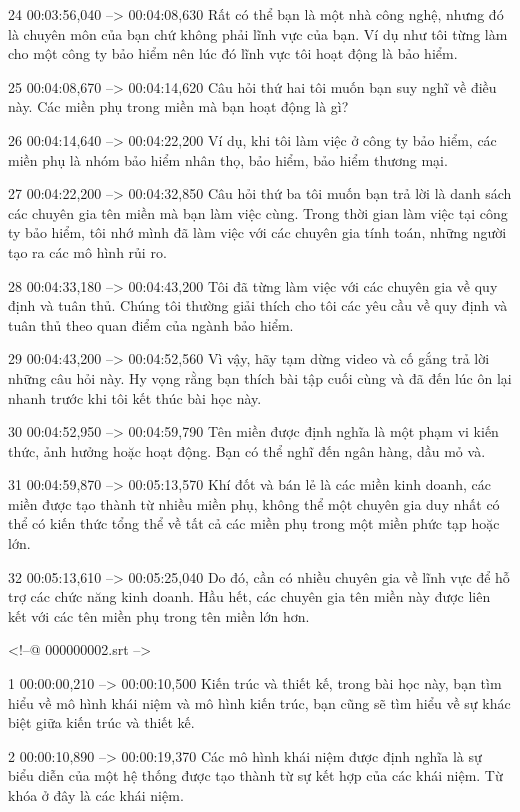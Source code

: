 24
00:03:56,040 --> 00:04:08,630
Rất có thể bạn là một nhà công nghệ, nhưng đó là chuyên môn của bạn chứ không phải lĩnh vực của bạn.  Ví dụ như tôi từng làm cho một công ty bảo hiểm nên lúc đó lĩnh vực tôi hoạt động là bảo hiểm.

25
00:04:08,670 --> 00:04:14,620
Câu hỏi thứ hai tôi muốn bạn suy nghĩ về điều này.  Các miền phụ trong miền mà bạn hoạt động là gì?

26
00:04:14,640 --> 00:04:22,200
Ví dụ, khi tôi làm việc ở công ty bảo hiểm, các miền phụ là nhóm bảo hiểm nhân thọ, bảo hiểm, bảo hiểm thương mại.

27
00:04:22,200 --> 00:04:32,850
Câu hỏi thứ ba tôi muốn bạn trả lời là danh sách các chuyên gia tên miền mà bạn làm việc cùng.  Trong thời gian làm việc tại công ty bảo hiểm, tôi nhớ mình đã làm việc với các chuyên gia tính toán, những người tạo ra các mô hình rủi ro.

28
00:04:33,180 --> 00:04:43,200
Tôi đã từng làm việc với các chuyên gia về quy định và tuân thủ.  Chúng tôi thường giải thích cho tôi các yêu cầu về quy định và tuân thủ theo quan điểm của ngành bảo hiểm.

29
00:04:43,200 --> 00:04:52,560
Vì vậy, hãy tạm dừng video và cố gắng trả lời những câu hỏi này.  Hy vọng rằng bạn thích bài tập cuối cùng và đã đến lúc ôn lại nhanh trước khi tôi kết thúc bài học này.

30
00:04:52,950 --> 00:04:59,790
Tên miền được định nghĩa là một phạm vi kiến ​​thức, ảnh hưởng hoặc hoạt động.  Bạn có thể nghĩ đến ngân hàng, dầu mỏ và.

31
00:04:59,870 --> 00:05:13,570
Khí đốt và bán lẻ là các miền kinh doanh, các miền được tạo thành từ nhiều miền phụ, không thể một chuyên gia duy nhất có thể có kiến ​​thức tổng thể về tất cả các miền phụ trong một miền phức tạp hoặc lớn.

32
00:05:13,610 --> 00:05:25,040
Do đó, cần có nhiều chuyên gia về lĩnh vực để hỗ trợ các chức năng kinh doanh.  Hầu hết, các chuyên gia tên miền này được liên kết với các tên miền phụ trong tên miền lớn hơn.

<!--@ 000000002.srt -->

1
00:00:00,210 --> 00:00:10,500
Kiến trúc và thiết kế, trong bài học này, bạn tìm hiểu về mô hình khái niệm và mô hình kiến ​​trúc, bạn cũng sẽ tìm hiểu về sự khác biệt giữa kiến ​​trúc và thiết kế.

2
00:00:10,890 --> 00:00:19,370
Các mô hình khái niệm được định nghĩa là sự biểu diễn của một hệ thống được tạo thành từ sự kết hợp của các khái niệm.  Từ khóa ở đây là các khái niệm.

